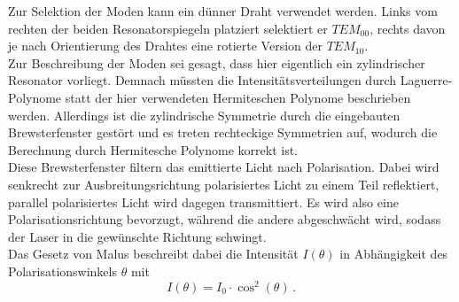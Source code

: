 Zur Selektion der Moden kann ein dünner Draht verwendet werden.
Links vom rechten der beiden Resonatorspiegeln platziert selektiert er $TEM_{00}$, rechts davon je nach Orientierung des Drahtes eine rotierte Version der $TEM_{10}$. \\

Zur Beschreibung der Moden sei gesagt, dass hier eigentlich ein zylindrischer Resonator vorliegt. 
Demnach müssten die Intensitätsverteilungen durch Laguerre-Polynome statt der hier verwendeten Hermiteschen Polynome beschrieben werden. 
Allerdings ist die zylindrische Symmetrie durch die eingebauten Brewsterfenster gestört und es treten rechteckige Symmetrien auf, wodurch die Berechnung durch Hermitesche Polynome korrekt ist. \\
Diese Brewsterfenster filtern das emittierte Licht nach Polarisation. 
Dabei wird senkrecht zur Ausbreitungsrichtung polarisiertes Licht zu einem Teil reflektiert, parallel polarisiertes Licht wird dagegen transmittiert.
Es wird also eine Polarisationsrichtung bevorzugt, während die andere abgeschwächt wird, sodass der Laser in die gewünschte Richtung schwingt.  \\
Das Gesetz von Malus beschreibt dabei die Intensität $I(\theta)$ in Abhängigkeit des Polarisationswinkels $\theta$ mit 
\begin{equation}
    I(\theta) = I_0 \cdot \cos^2(\theta) \,.
    \label{eq:malus}
\end{equation}





